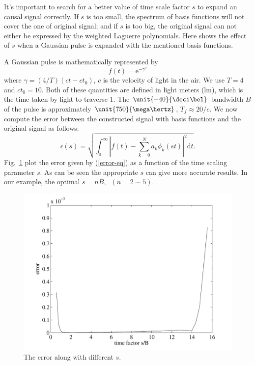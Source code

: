 \documentclass[conference, a4paper]{IEEEtran}
\begin{document}
It's important to search for a better value of time scale factor $s$ to
expand an causal signal correctly. If $s$ is too small, the spectrum of
basis functions will not cover the one of original signal; and if $s$ is
too big, the original signal can not either be expressed by the weighted
Laguerre polynomials. Here shows the effect of $s$ when a Gaussian pulse
is expanded with the mentioned basis functions.

A Gaussian pulse is mathematically represented by
\begin{equation}
f(t)=\mathrm{e}^{-\gamma^2}
\end{equation}
where $\gamma=(4/T)(ct-ct_0)$, $c$ is the velocity of light in the air.
We use $T=4$ and $ct_0=10$. Both of these quantities are defined in
light meters (lm), which is the time taken by light to traverse
\unit{1}{\meter}. The $\unit{-40}{\deci\bel}$ bandwidth $B$ of the pulse
is approximately $\unit{750}{\mega\hertz}$, $T_f\approx 20/c$. We now
compute the error between the constructed signal with basis functions
and the original signal as follows:
\begin{equation}
\epsilon(s)=\sqrt{\int_0^\infty\left | f(t)-\sum_{k=0}^N
a_k\phi_k(st)\right | ^2\mathrm{d}t}.\label{error-eq}
\end{equation}
Fig.~\ref{error} plot the error given by (\ref{error-eq}) as a function of
the time scaling parameter $s$. As can be seen the appropriate $s$ can
give more accurate results. In our example, the optimal $s=nB,\;\;(n=2\sim 5)$.
\begin{figure}
    \centering
    \includegraphics[scale=.48]{error.pdf}
    \caption{The error along with different $s$.}
    \label{error}
\end{figure}
\end{document}
